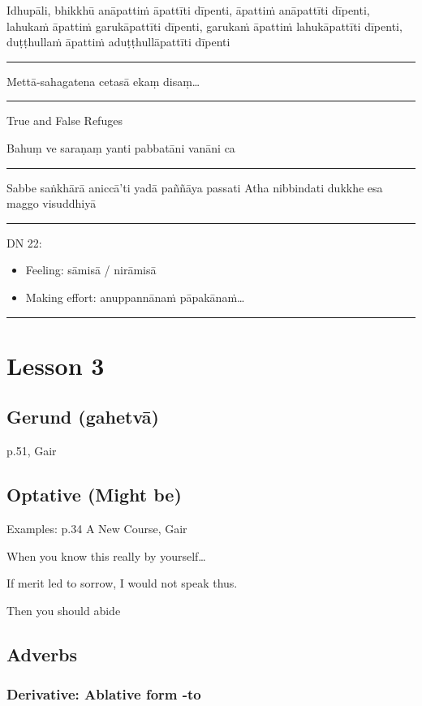 \documentclass[11pt,oneside]{memoir}
\begin{document}
Idhupāli, bhikkhū anāpattiṁ āpattīti dīpenti, āpattiṁ anāpattīti dīpenti, lahukaṁ āpattiṁ garukāpattīti dīpenti, garukaṁ āpattiṁ lahukāpattīti dīpenti, duṭṭhullaṁ āpattiṁ aduṭṭhullāpattīti dīpenti

\noindent\rule{\textwidth}{0.5pt}

Mettā-sahagatena cetasā ekaṃ disaṃ\ldots{}

\noindent\rule{\textwidth}{0.5pt}

True and False Refuges

Bahuṃ ve saraṇaṃ yanti pabbatāni vanāni ca

\noindent\rule{\textwidth}{0.5pt}

Sabbe saṅkhārā aniccā’ti yadā paññāya passati
Atha nibbindati dukkhe esa maggo visuddhiyā

\noindent\rule{\textwidth}{0.5pt}

DN 22:
\begin{itemize}
\item Feeling: sāmisā / nirāmisā
\item Making effort: anuppannānaṁ pāpakānaṁ\ldots{}
\end{itemize}

\noindent\rule{\textwidth}{0.5pt}

\chapter{Lesson 3}
\label{sec:org879f16e}
\section{Gerund (gahetvā)}
\label{sec:orga88165b}

p.51, Gair

\section{Optative (Might be)}
\label{sec:org05f9a3e}

Examples: p.34 A New Course, Gair

When you know this really by yourself\ldots{}

If merit led to sorrow, I would not speak thus.

Then you should abide

\section{Adverbs}
\label{sec:org415d69e}
\subsection{Derivative: Ablative form -to}
\label{sec:orgc63b995}
\end{document}
